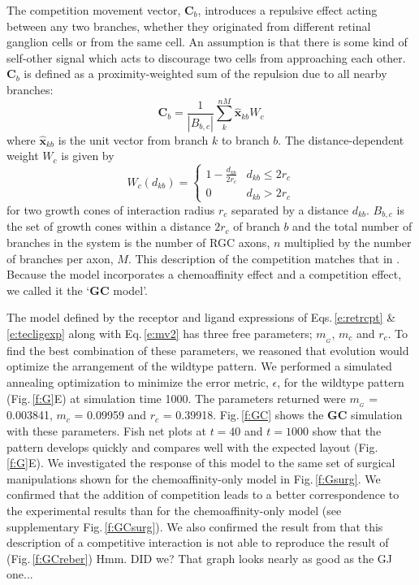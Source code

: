 \documentclass[11pt, a4paper]{article}
\begin{document}
%
The competition movement vector, $\mathbf{C}_b$, introduces a repulsive effect
acting between any two branches, whether they originated from different
retinal ganglion cells or from the same cell. An assumption is that there is
some kind of self-other signal which acts to discourage two cells from
approaching each other. $\mathbf{C}_b$ is defined as a proximity-weighted sum
of the repulsion due to all nearby branches:
%
\begin{equation} \label{e:C}
\mathbf{C}_b = \frac{1}{|B_{b,c}|} \sum_k^{nM} \hat{\mathbf{x}}_{kb} W_c
\end{equation}
where $\hat{\mathbf{x}}_{kb}$ is the unit vector from branch $k$ to branch
$b$. The distance-dependent weight $W_c$ is given by
\begin{equation}
W_c(d_{kb}) = \begin{cases}
      1 - \frac{d_{kb}}{2r_c}   & d_{kb} \leq 2r_c \\
     0 & d_{kb} > 2r_c
     \end{cases}
\end{equation}
for two growth cones of interaction radius $r_c$ separated by a distance
$d_{kb}$. $B_{b,c}$ is the set of growth cones within a distance $2r_c$ of
branch $b$ and the total number of branches in the system is the number of RGC
axons, $n$ multiplied by the number of branches per axon, $M$. This
description of the competition matches that
in \citet{simpson_simple_2011}. Because the model incorporates a chemoaffinity
effect and a competition effect, we called it the `$\mathbf{GC}$ model'.

The model defined by the receptor and ligand expressions of Eqs.\,\ref{e:retrcpt}
\& \ref{e:tecligexp} along with Eq.\,\ref{e:mv2} has three
free parameters; $m_{\!_G}$, $m_c$ and $r_c$. To find the best combination of
these parameters, we reasoned that evolution would optimize the arrangement of
the wildtype pattern. We performed a simulated annealing optimization to
minimize the error metric, $\epsilon$, for the wildtype pattern
(Fig.\,\ref{f:G}E) at simulation time 1000. The parameters returned were
$m_{\!_G}$ = 0.003841, $m_c$ = 0.09959 and $r_c$ = 0.39918. Fig.\,\ref{f:GC}
shows the $\mathbf{GC}$ simulation with these parameters. Fish net plots at
$t=40$ and $t=1000$ show that the pattern develops quickly and compares well
with the expected layout (Fig.\,\ref{f:G}E). We investigated the response of
this model to the same set of surgical manipulations shown for the
chemoaffinity-only model in Fig.\,\ref{f:Gsurg}. We confirmed that the
addition of competition leads to a better correspondence to the experimental
results than for the chemoaffinity-only model (see supplementary
Fig.\,\ref{f:GCsurg}). We also confirmed the result
from \citet{simpson_simple_2011} that this description of a competitive
interaction is not able to reproduce the result of \citet{reber_relative_2004}
(Fig.\,\ref{f:GCreber}) Hmm. DID we? That graph looks nearly as good as the GJ
one...
\end{document}
